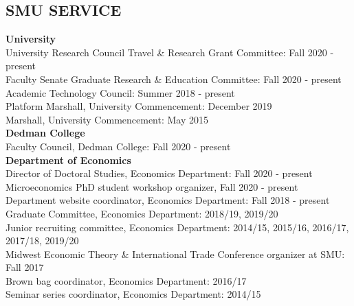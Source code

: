 \documentclass[11pt]{res}
\begin{document}
\begin{resume}
\section{SMU SERVICE} \vspace{1.5mm}
\textbf{University}\vspace{1.5mm}\\
University Research Council Travel \& Research Grant Committee: Fall 2020 - present\vspace{1.5mm}\\
Faculty Senate Graduate Research \& Education Committee: Fall 2020 - present\vspace{1.5mm}\\
Academic Technology Council: Summer 2018 - present\vspace{1.5mm}\\
Platform Marshall, University Commencement: December 2019\vspace{1.5mm}\\
Marshall, University Commencement: May 2015\vspace{4mm}\\
\textbf{Dedman College}\vspace{1.5mm}\\
Faculty Council, Dedman College: Fall 2020 - present\vspace{4mm}\\
\textbf{Department of Economics}\vspace{1.5mm}\\
Director of Doctoral Studies, Economics Department: Fall 2020 - present\vspace{1.5mm}\\
Microeconomics PhD student workshop organizer, Fall 2020 - present\vspace{1.5mm}\\
Department website coordinator, Economics Department: Fall 2018 - present\vspace{1.5mm}\\
Graduate Committee, Economics Department: 2018/19, 2019/20\vspace{1.5mm}\\
Junior recruiting committee, Economics Department: 2014/15, 2015/16, 2016/17, 2017/18, 2019/20\vspace{1.5mm}\\
Midwest Economic Theory \& International Trade Conference organizer at SMU: Fall 2017\vspace{1.5mm}\\
Brown bag coordinator, Economics Department: 2016/17\vspace{1.5mm}\\
Seminar series coordinator, Economics Department: 2014/15

\end{resume}
\end{document}
